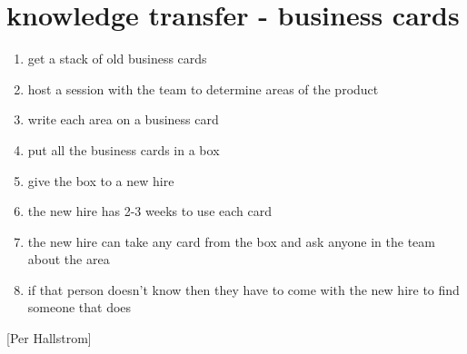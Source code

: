 \section*{knowledge transfer - business cards}
\begin{enumerate}
\item get a stack of old business cards
\item host a session with the team to determine areas of the product
\item write each area on a business card
\item put all the business cards in a box
\item give the box to a new hire
\item the new hire has 2-3 weeks to use each card
\item the new hire can take any card from the box and ask anyone in the team about the area
\item if that person doesn't know then they have to come with the new hire to find someone that does
\end{enumerate}
[Per Hallstrom]
